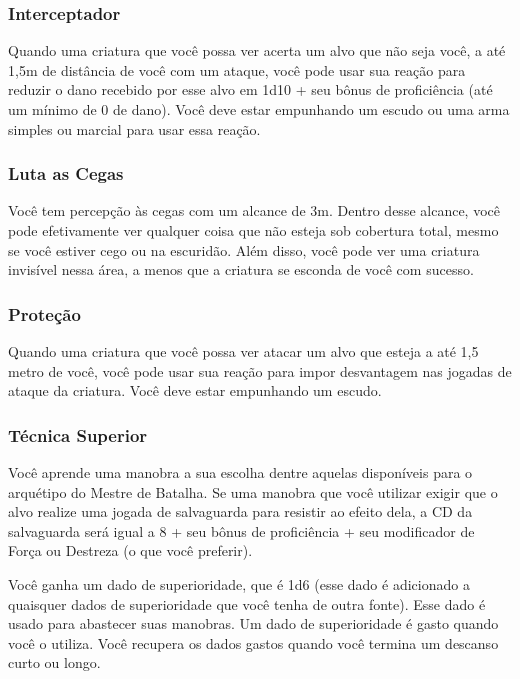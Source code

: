 \documentclass{RPG_Adventure}[2021/10/20]
\begin{document}
\begin{multicols}{2}
\subsubsection{Interceptador}%

Quando uma criatura que você possa ver acerta um alvo que não seja você, a até
1,5m de distância de você com um ataque, você pode usar sua reação para reduzir
o dano recebido por esse alvo em 1d10 + seu bônus de proficiência (até um mínimo
de 0 de dano). Você deve estar empunhando um escudo ou uma arma simples ou
marcial para usar essa reação.

\subsubsection{Luta as Cegas}%

Você tem percepção às cegas com um alcance de 3m. Dentro desse alcance, você
pode efetivamente ver qualquer coisa que não esteja sob cobertura total, mesmo
se você estiver cego ou na escuridão. Além disso, você pode ver uma criatura
invisível nessa área, a menos que a criatura se esconda de você com sucesso.

\subsubsection{Proteção}%

Quando uma criatura que você possa ver atacar um alvo que esteja a até 1,5 metro
de você, você pode usar sua reação para impor desvantagem nas jogadas de ataque
da criatura. Você deve estar empunhando um escudo.

\subsubsection{Técnica Superior}%

Você aprende uma manobra a sua escolha dentre aquelas disponíveis para o
arquétipo do Mestre de Batalha. Se uma manobra que você utilizar exigir que o
alvo realize uma jogada de salvaguarda para resistir ao efeito dela, a CD da
salvaguarda será igual a 8 + seu bônus de proficiência + seu modificador de
Força ou Destreza (o que você preferir).

Você ganha um dado de superioridade, que é 1d6 (esse dado é adicionado a
quaisquer dados de superioridade que você tenha de outra fonte). Esse dado é
usado para abastecer suas manobras. Um dado de superioridade é gasto quando você
o utiliza. Você recupera os dados gastos quando você termina um descanso curto
ou longo.


\end{multicols}
\end{document}

